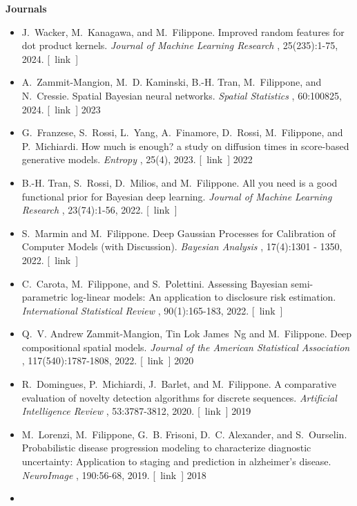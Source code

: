 \documentclass[10pt]{article}
\begin{document}
\textbf{Journals}
\begin{itemize}
2024\item 

  J. Wacker, M. Kanagawa, and M. Filippone. Improved random features for dot product kernels. \emph{Journal of Machine Learning Research}
, 25(235):1-75, 2024. [ link ] 

\item 

  A. Zammit-Mangion, M. D. Kaminski, B.-H. Tran, M. Filippone, and N. Cressie. Spatial Bayesian neural networks. \emph{Spatial Statistics}
, 60:100825, 2024. [ link ] 
2023
\item 

  G. Franzese, S. Rossi, L. Yang, A. Finamore, D. Rossi, M. Filippone, and P. Michiardi. How much is enough? a study on diffusion times in score-based generative models. \emph{Entropy}
, 25(4), 2023. [ link ] 
2022
\item 

  B.-H. Tran, S. Rossi, D. Milios, and M. Filippone. All you need is a good functional prior for Bayesian deep learning. \emph{Journal of Machine Learning Research}
, 23(74):1-56, 2022. [ link ] 

\item 

  S. Marmin and M. Filippone. Deep Gaussian Processes for Calibration of Computer Models (with Discussion). \emph{Bayesian Analysis}
, 17(4):1301 - 1350, 2022. [ link ] 

\item 

  C. Carota, M. Filippone, and S. Polettini. Assessing Bayesian semi-parametric log-linear models: An application to disclosure risk estimation. \emph{International Statistical Review}
, 90(1):165-183, 2022. [ link ] 

\item 

  Q. V. Andrew Zammit-Mangion, Tin Lok James Ng and M. Filippone. Deep compositional spatial models. \emph{Journal of the American Statistical Association}
, 117(540):1787-1808, 2022. [ link ] 
2020
\item 

  R. Domingues, P. Michiardi, J. Barlet, and M. Filippone. A comparative evaluation of novelty detection algorithms for discrete sequences. \emph{Artificial Intelligence Review}
, 53:3787-3812, 2020. [ link ] 
2019
\item 

  M. Lorenzi, M. Filippone, G. B. Frisoni, D. C. Alexander, and S. Ourselin. Probabilistic disease progression modeling to characterize diagnostic uncertainty: Application to staging and prediction in alzheimer's disease. \emph{NeuroImage}
, 190:56-68, 2019. [ link ] 
2018
\item 


\end{itemize}
\end{document}
